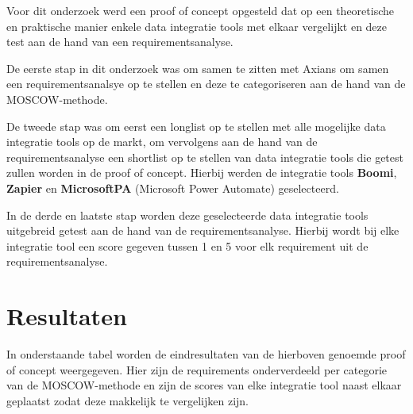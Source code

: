 \documentclass[a0,portrait]{hogent-poster}
\begin{document}
\begin{multicols}{2}
Voor dit onderzoek werd een proof of concept opgesteld dat op een theoretische en praktische manier enkele data integratie tools met elkaar vergelijkt en deze test aan de hand van een requirementsanalyse.

\vspace{\baselineskip}

De eerste stap in dit onderzoek was om samen te zitten met Axians om samen een requirementsanalsye op te stellen en deze te categoriseren aan de hand van de MOSCOW-methode.

\vspace{\baselineskip}

De tweede stap was om eerst een longlist op te stellen met alle mogelijke data integratie tools op de markt, om vervolgens aan de hand van de requirementsanalyse een shortlist op te stellen van data integratie tools die getest zullen worden in de proof of concept. Hierbij werden de integratie tools \textbf{Boomi}, \textbf{Zapier} en \textbf{MicrosoftPA} (Microsoft Power Automate) geselecteerd.

\vspace{\baselineskip}

In de derde en laatste stap worden deze geselecteerde data integratie tools uitgebreid getest aan de hand van de requirementsanalyse. Hierbij wordt bij elke integratie tool een score gegeven tussen 1 en 5 voor elk requirement uit de requirementsanalyse.

\section{Resultaten}

In onderstaande tabel worden de eindresultaten van de hierboven genoemde proof of concept weergegeven. Hier zijn de requirements onderverdeeld per categorie van de MOSCOW-methode en zijn de scores van elke integratie tool naast elkaar geplaatst zodat deze makkelijk te vergelijken zijn.


\end{multicols}
\end{document}
